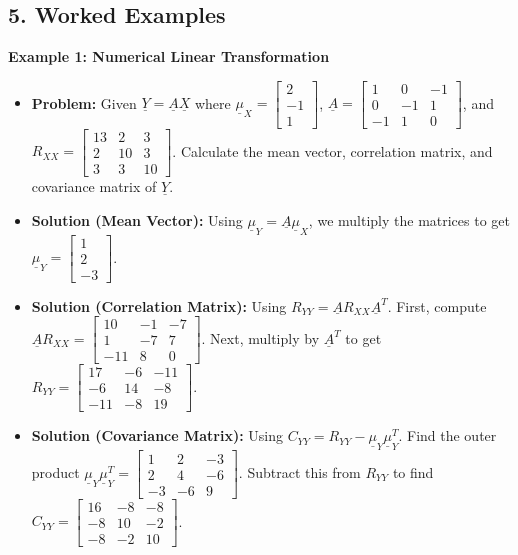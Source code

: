 \documentclass[12pt]{article}
\begin{document}
\subsection*{5. Worked Examples}

\textbf{Example 1: Numerical Linear Transformation}
\begin{itemize}
    \item \textbf{Problem:} Given $\underline{Y} = \underline{A}\underline{X}$ where 
    $\underline{\mu}_X = \begin{bmatrix} 2 \\ -1 \\ 1 \end{bmatrix}$, 
    $\underline{A} = \begin{bmatrix} 1 & 0 & -1 \\ 0 & -1 & 1 \\ -1 & 1 & 0 \end{bmatrix}$, and 
    $R_{XX} = \begin{bmatrix} 13 & 2 & 3 \\ 2 & 10 & 3 \\ 3 & 3 & 10 \end{bmatrix}$. 
    Calculate the mean vector, correlation matrix, and covariance matrix of $\underline{Y}$.
    
    \item \textbf{Solution (Mean Vector):} Using $\underline{\mu}_Y = \underline{A}\underline{\mu}_X$, we multiply the matrices to get 
    $\underline{\mu}_Y = \begin{bmatrix} 1 \\ 2 \\ -3 \end{bmatrix}$.
    
    \item \textbf{Solution (Correlation Matrix):} Using $R_{YY} = \underline{A}R_{XX}\underline{A}^T$. First, compute 
    $\underline{A}R_{XX} = \begin{bmatrix} 10 & -1 & -7 \\ 1 & -7 & 7 \\ -11 & 8 & 0 \end{bmatrix}$. 
    Next, multiply by $\underline{A}^T$ to get 
    $R_{YY} = \begin{bmatrix} 17 & -6 & -11 \\ -6 & 14 & -8 \\ -11 & -8 & 19 \end{bmatrix}$.
    
    \item \textbf{Solution (Covariance Matrix):} Using $C_{YY} = R_{YY} - \underline{\mu}_Y\underline{\mu}_Y^T$. Find the outer product 
    $\underline{\mu}_Y\underline{\mu}_Y^T = \begin{bmatrix} 1 & 2 & -3 \\ 2 & 4 & -6 \\ -3 & -6 & 9 \end{bmatrix}$. 
    Subtract this from $R_{YY}$ to find 
    $C_{YY} = \begin{bmatrix} 16 & -8 & -8 \\ -8 & 10 & -2 \\ -8 & -2 & 10 \end{bmatrix}$.
\end{itemize}
\end{document}
